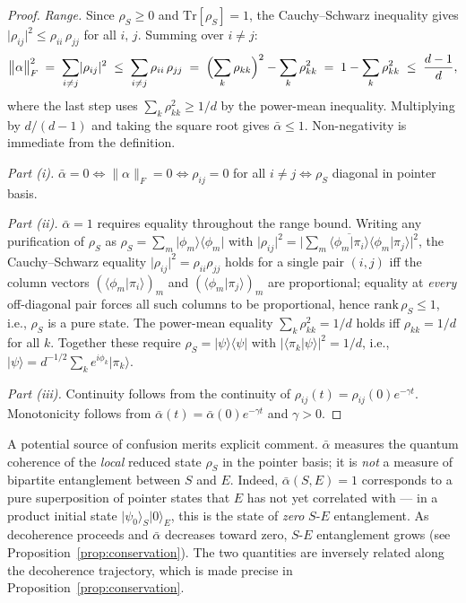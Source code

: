 \begin{proof}
\emph{Range.}
Since $\rho_S \geq 0$ and $\mathrm{Tr}[\rho_S] = 1$, the Cauchy--Schwarz
inequality gives
$\lvert\rho_{ij}\rvert^2 \leq \rho_{ii}\,\rho_{jj}$ for all $i,\,j$.
Summing over $i \neq j$:
\begin{equation*}
  \bigl\lVert\alpha\bigr\rVert_F^2
  \;=\; \sum_{i\neq j}\lvert\rho_{ij}\rvert^2
  \;\leq\; \sum_{i\neq j}\rho_{ii}\,\rho_{jj}
  \;=\; \Bigl(\sum_k\rho_{kk}\Bigr)^2 - \sum_k\rho_{kk}^2
  \;=\; 1 - \sum_k\rho_{kk}^2
  \;\leq\; \frac{d-1}{d},
\end{equation*}
where the last step uses $\sum_k\rho_{kk}^2 \geq 1/d$ by the
power-mean inequality.
Multiplying by $d/(d-1)$ and taking the square root gives
$\bar{\alpha} \leq 1$.
Non-negativity is immediate from the definition.

\emph{Part (i).}
$\bar{\alpha} = 0 \Leftrightarrow \lVert\alpha\rVert_F = 0
\Leftrightarrow \rho_{ij} = 0$ for all $i \neq j
\Leftrightarrow \rho_S$ diagonal in pointer basis.

\emph{Part (ii).}
$\bar{\alpha} = 1$ requires equality throughout the range bound.
Writing any purification of $\rho_S$ as
$\rho_S = \sum_m\vert\phi_m\rangle\langle\phi_m\vert$ with
$\lvert\rho_{ij}\rvert^2
  = \bigl\lvert\sum_m\overline{\langle\phi_m\vert\pi_i\rangle}
                       \langle\phi_m\vert\pi_j\rangle\bigr\rvert^2$,
the Cauchy--Schwarz equality
$\lvert\rho_{ij}\rvert^2 = \rho_{ii}\rho_{jj}$ holds for a single pair
$(i,j)$ iff the column vectors
$(\langle\phi_m\vert\pi_i\rangle)_m$ and
$(\langle\phi_m\vert\pi_j\rangle)_m$ are proportional;
equality at \emph{every} off-diagonal pair forces all such columns to be
proportional, hence $\mathrm{rank}\,\rho_S \leq 1$, i.e., $\rho_S$ is a
pure state.
The power-mean equality $\sum_k\rho_{kk}^2 = 1/d$ holds iff
$\rho_{kk} = 1/d$ for all $k$.
Together these require $\rho_S = \vert\psi\rangle\langle\psi\vert$
with $\lvert\langle\pi_k\vert\psi\rangle\rvert^2 = 1/d$, i.e.,
$\vert\psi\rangle = d^{-1/2}\sum_k e^{i\phi_k}\vert\pi_k\rangle$.

\emph{Part (iii).}
Continuity follows from the continuity of $\rho_{ij}(t) = \rho_{ij}(0)e^{-\gamma t}$.
Monotonicity follows from $\bar{\alpha}(t) = \bar{\alpha}(0)e^{-\gamma t}$
and $\gamma > 0$.
\end{proof}

\begin{remark}
\label{rem:affinity-vs-entanglement}
A potential source of confusion merits explicit comment.
$\bar{\alpha}$ measures the quantum coherence of the \emph{local}
reduced state $\rho_S$ in the pointer basis; it is \emph{not}
a measure of bipartite entanglement between $S$ and $E$.
Indeed, $\bar{\alpha}(S,E) = 1$ corresponds to a pure superposition of
pointer states that $E$ has not yet correlated with --- in a product
initial state $\vert\psi_0\rangle_S\vert 0\rangle_E$, this is the
state of \emph{zero} $S$-$E$ entanglement.
As decoherence proceeds and $\bar{\alpha}$ decreases toward zero,
$S$-$E$ entanglement grows (see Proposition~\ref{prop:conservation}).
The two quantities are inversely related along the decoherence
trajectory, which is made precise in Proposition~\ref{prop:conservation}.
\end{remark}


